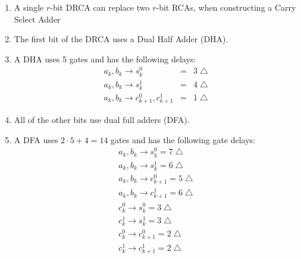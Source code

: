 \documentclass[times, twocolumn, 10pt]{article}
\begin{document}
\begin{enumerate}
\begin{enumerate}
  \item A single $r$-bit DRCA can replace two $r$-bit RCAs, when 
    constructing a Carry Select Adder

  \item The first bit of the DRCA uses a Dual Half Adder (DHA). 

  \item A DHA uses 5 gates and has the following delays:
    \begin{eqnarray*}
      a_{k}, b_{k} \rightarrow s_{k}^{0} & = & 3 \bigtriangleup \\
      a_{k}, b_{k} \rightarrow s_{k}^{1} & = & 4 \bigtriangleup \\
      a_{k}, b_{k} \rightarrow c_{k+1}^{0}, c_{k+1}^{1} & = & 1
      \bigtriangleup
    \end{eqnarray*}

  \item All of the other bits use dual full adders (DFA). 

  \item A DFA uses $2 \cdot 5 + 4 = 14$ gates and has the following
    gate delays: 
    \begin{eqnarray*}
      a_{k}, b_{k} \rightarrow s_{k}^{0} = 7 \bigtriangleup \\
      a_{k}, b_{k} \rightarrow s_{k}^{1} = 6 \bigtriangleup \\
      a_{k}, b_{k} \rightarrow c_{k+1}^{0} = 5 \bigtriangleup \\
      a_{k}, b_{k} \rightarrow c_{k+1}^{1} = 6 \bigtriangleup \\
      c_{k}^{0} \rightarrow s_{k}^{0} = 3 \bigtriangleup \\
      c_{k}^{1} \rightarrow s_{k}^{1} = 3 \bigtriangleup \\
      c_{k}^{0} \rightarrow c_{k+1}^{0} = 2 \bigtriangleup \\
      c_{k}^{1} \rightarrow c_{k+1}^{1} = 2 \bigtriangleup 
    \end{eqnarray*}


\end{enumerate}
\end{enumerate}
\end{document}
